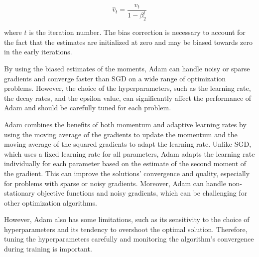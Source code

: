 \begin{equation}
    \hat{v}_t = \frac{v_t}{1-\beta_2^t}
\end{equation}

where $t$ is the iteration number. The bias correction is necessary to account for the fact that the estimates are initialized at zero and may be biased towards zero in the early iterations.

By using the biased estimates of the moments, Adam can handle noisy or sparse gradients and converge faster than SGD on a wide range of optimization problems. However, the choice of the hyperparameters, such as the learning rate, the decay rates, and the epsilon value, can significantly affect the performance of Adam and should be carefully tuned for each problem.

Adam combines the benefits of both momentum and adaptive learning rates by using the moving average of the gradients to update the momentum and the moving average of the squared gradients to adapt the learning rate. Unlike \ac{SGD}, which uses a fixed learning rate for all parameters, Adam adapts the learning rate individually for each parameter based on the estimate of the second moment of the gradient. This can improve the solutions' convergence and quality, especially for problems with sparse or noisy gradients. Moreover, Adam can handle non-stationary objective functions and noisy gradients, which can be challenging for other optimization algorithms.

However, Adam also has some limitations, such as its sensitivity to the choice of hyperparameters and its tendency to overshoot the optimal solution. Therefore, tuning the hyperparameters carefully and monitoring the algorithm's convergence during training is important.